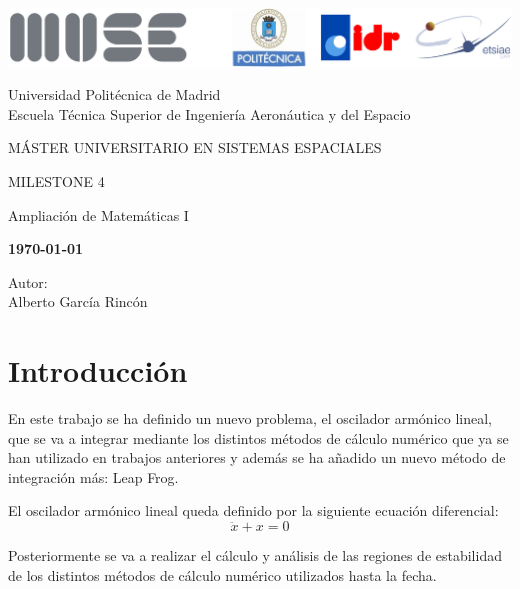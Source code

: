 \documentclass[12pt,a4paper]{article}
\begin{document}
	
\begin{titlepage}
	\centering
	\includegraphics[width=\textwidth]{FIGURES/Portada/Logo_portada.png} 
	\vspace{1.5cm}
	
	Universidad Politécnica de Madrid
	\\Escuela Técnica Superior de Ingeniería Aeronáutica y del Espacio
	\vspace{2cm}
	
	{\large MÁSTER UNIVERSITARIO EN SISTEMAS ESPACIALES}
	\vspace{2cm}
	
	{\LARGE MILESTONE 4}
	\vspace{1cm}
	
	{\large Ampliación de Matemáticas I}
	\vspace{4cm}
	
	\begin{center}
		\large{\textbf{\today}} \\
	\end{center}
	
	Autor: \\ Alberto García Rincón
	\vfill
\end{titlepage}

\newpage
\pagestyle{empty}
\tableofcontents	

\newpage
{}
\setcounter{page}{1}
\pagestyle{fancy} 

\section{Introducción}
En este trabajo se ha definido un nuevo problema, el oscilador armónico lineal, que se va a integrar mediante los distintos métodos de cálculo numérico que ya se han utilizado en trabajos anteriores y además se ha añadido un nuevo método de integración más: Leap Frog.

El oscilador armónico lineal queda definido por la siguiente ecuación diferencial:
\begin{equation} \label{osci}
	\ddot{x} + x = 0 
\end{equation}

Posteriormente se va a realizar el cálculo y análisis de las regiones de estabilidad de los distintos métodos de cálculo numérico utilizados hasta la fecha. 
\end{document}
